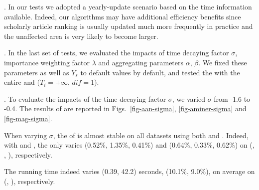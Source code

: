 .
In our tests we adopted a yearly-update scenario based on the time information available. Indeed, our algorithms may have additional efficiency benefits since scholarly article ranking is usually updated much more frequently in practice and the unaffected area is very likely to become larger.



.
In the last set of tests, we evaluated the impacts of time decaying factor $\sigma$, importance weighting factor $\lambda$ and aggregating parameters $\alpha$, $\beta$. We fixed these parameters as well as $Y_s$ to default values by default, and tested the \PairAcc with the entire \recom and \fcita (\ie $T_i=+\infty$, $dif=1$).





.
To evaluate the impacts of the time decaying factor $\sigma$, we varied $\sigma$ from -1.6 to -0.4.
The results of \PairAcc are reported in Figs.~\ref{fig-aan-sigma}, \ref{fig-aminer-sigma} and \ref{fig-mag-sigma}.


When varying $\sigma$, the \PairAcc of \ensemblerank is almost stable on all datasets using both \recom and \fcita. Indeed, with \recom and \fcita, the \PairAcc only varies (0.52\%, 1.35\%, 0.41\%) and (0.64\%, 0.33\%, 0.62\%) on (\aan, \aminer, \magdata), respectively.

The running time indeed varies (0.39, 42.2) seconds, \ie (10.1\%, 9.0\%), on average on (\aminer, \magdata), respectively.



